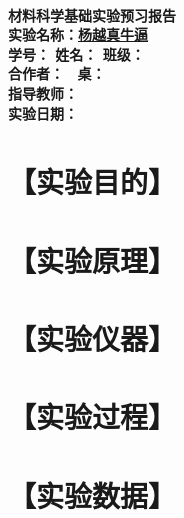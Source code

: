 \documentclass[a4paper,utf8]{article}
\begin{document}
\begin{center}
    {\mbox{}\\[7em]\bfseries\songti%
    材料科学基础实验预习报告}\\[34mm]
    {\bfseries\songti
    实验名称：\uline{\hfill\mbox{杨越真牛逼}\hfill} \\[2.9mm]
    学\quad 号：\uline{}\hfill
    姓\quad 名：\uline{}\hfill
    班\quad 级：\uline{} \\[2.9mm]
    合作者：\uline{\makebox[25mm]{}}\enspace~
    桌：\uline{\makebox[25mm]{}}\hfill\mbox{}\\[2.9mm]
    指导教师：\uline{\makebox[30mm]{}}\hfill\mbox{} \\[2.9mm]
    实验日期：\uline{\makebox[30mm]{}}\hfill\mbox{} \\[58.7mm]
    }
\end{center}
\newpage
\section*{【实验目的】}
\section*{【实验原理】}%
\section*{【实验仪器】}%
\section*{【实验过程】}%
\section*{【实验数据】}
\end{document}
